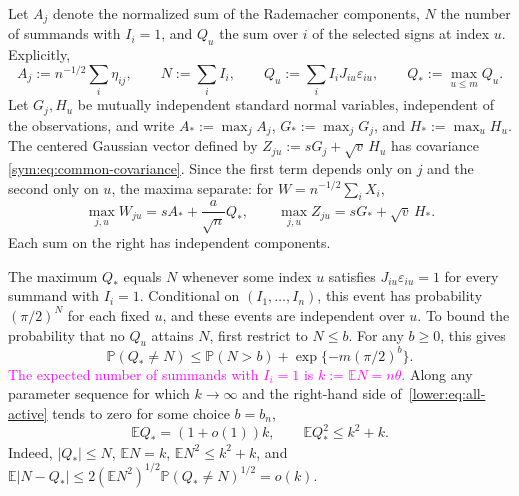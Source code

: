 \documentclass[11pt,letterpaper]{article}
\newenvironment{recovered}{\color{magenta}}{}
\theoremstyle{remark}
\newcommand{\E}{\mathbb E}
\newcommand{\Pp}{\mathbb P}
\begin{document}
\begin{recovered}
Let \(A_j\) denote the normalized sum of the Rademacher components,
\(N\) the number of summands with \(I_i=1\), and \(Q_u\) the sum
over \(i\) of the selected signs at index \(u\). Explicitly,
\end{recovered}
\[
 A_j:=n^{-1/2}\sum_i\eta_{ij},\qquad
 N:=\sum_iI_i,\qquad Q_u:=\sum_iI_iJ_{iu}\varepsilon_{iu},
 \qquad Q_*:=\max_{u\le m}Q_u.
\]
Let \(G_j,H_u\) be mutually independent standard normal variables,
independent of the observations, and write
\(A_*:=\max_jA_j\), \(G_*:=\max_jG_j\), and \(H_*:=\max_uH_u\).
The centered Gaussian vector defined by
\(Z_{ju}:=sG_j+\sqrt v\,H_u\) has covariance
\eqref{sym:eq:common-covariance}. Since the first term depends only
on \(j\) and the second only on \(u\), the maxima separate:
for \(W=n^{-1/2}\sum_iX_i\),
\begin{equation}
 \max_{j,u}W_{ju}=sA_*+\frac a{\sqrt n}Q_*,
 \qquad \max_{j,u}Z_{ju}=sG_*+\sqrt v\,H_*.
 \label{sym:eq:common-maxima}
\end{equation}
Each sum on the right has independent components.

\begin{recovered}
The maximum \(Q_*\) equals \(N\) whenever some index \(u\) satisfies
\(J_{iu}\varepsilon_{iu}=1\) for every summand with \(I_i=1\).
Conditional on \((I_1,\ldots,I_n)\), this event has probability
\((\pi/2)^N\) for each fixed \(u\), and these events are independent
over \(u\). To bound the probability that no \(Q_u\) attains \(N\),
first restrict to \(N\le b\). For any \(b\ge0\), this gives
\end{recovered}
\begin{equation}
 \Pp(Q_*\ne N)\le \Pp(N>b)+\exp\{-m(\pi/2)^b\}.
 \label{lower:eq:all-active}
\end{equation}
\textcolor{magenta}{The expected number of summands with \(I_i=1\) is \(k:=\E N=n\theta\).}
Along any parameter sequence for which \(k\to\infty\) and the
right-hand side of~\eqref{lower:eq:all-active} tends to zero for
some choice \(b=b_n\),
\begin{equation}
 \E Q_*=(1+o(1))k,\qquad \E Q_*^2\le k^2+k.
 \label{lower:eq:activation-moments}
\end{equation}
\begin{recovered}
Indeed, \(|Q_*|\le N\), \(\E N=k\), \(\E N^2\le k^2+k\), and
\end{recovered}
\(\E|N-Q_*|\le2(\E N^2)^{1/2}\Pp(Q_*\ne N)^{1/2}=o(k)\).
\end{document}
